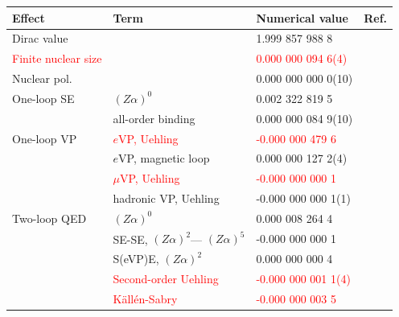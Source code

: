 \begin{table}
\setlength\extrarowheight{7pt}
\centering
\begin{footnotesize}
\begin{tabular}{llll}
Effect                  & Term                  & Numerical value                 & Ref. \\
\hline
Dirac value             &                       & \phantom{-}1.999 857 988 8      & \cite{breit1928,CODATA2014} \\
\textcolor{red}{Finite nuclear size}     &                       & \textcolor{red}{\phantom{-}0.000 000 094 6(4)}   & \cite{Angeli2013} \\
Nuclear pol.    &                       & \phantom{-}0.000 000 000 0(10)  &  \\
One-loop SE             & $(Z \alpha)^0$        & \phantom{-}0.002 322 819 5      & \cite{Schwinger48,CODATA2014} \\
                        & all-order binding     & \phantom{-}0.000 000 084 9(10)  & \\
One-loop VP             & \textcolor{red}{$e$VP, Uehling}        & \textcolor{red}{-0.000 000 479 6}                & \cite{Karshenboim2001} \\
                        & $e$VP, magnetic loop  & \phantom{-}0.000 000 127 2(4)   & \\
                        & \textcolor{red}{$\mu$VP, Uehling}      &           \textcolor{red}{-0.000 000 000 1}      & \cite{Karshenboim2001}\\
                        & hadronic VP, Uehling  &           -0.000 000 000 1(1)   & \\
Two-loop QED            &  $(Z \alpha)^0$       & \phantom{-}0.000 008 264 4      &  \cite{Peterman57,Sommerfield58} \\
                        & SE-SE, $(Z \alpha)^2$--- $(Z \alpha)^5$ & -0.000 000 000 1& \cite{Eides1997,Czarnecki2000,Pachucki2005,czarnecki2018}\\
                        & S(eVP)E, $(Z \alpha)^2$                 & \phantom{-}0.000 000 000 4& \cite{Peterman57,Sommerfield58,Eides1997,Czarnecki2000}\\
                        & \textcolor{red}{Second-order Uehling}  & \textcolor{red}{-0.000 000 001 1(4)}             & \\
                        & \textcolor{red}{K\"all\'en-Sabry}      & \textcolor{red}{-0.000 000 003 5}                & \\

\end{tabular}
\end{footnotesize}
\end{table}
